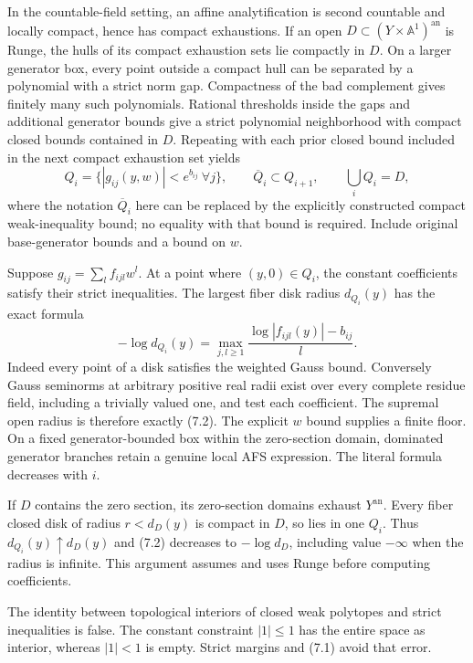 \documentclass[
  10pt,
]{article}
\begin{document}
In the countable-field setting, an affine analytification is second
countable and locally compact, hence has compact exhaustions. If an open
\(D\subset(Y\times\mathbb A^1)^{\mathrm{an}}\) is Runge, the hulls of
its compact exhaustion sets lie compactly in \(D\). On a larger
generator box, every point outside a compact hull can be separated by a
polynomial with a strict norm gap. Compactness of the bad complement
gives finitely many such polynomials. Rational thresholds inside the
gaps and additional generator bounds give a strict polynomial
neighborhood with compact closed bounds contained in \(D\). Repeating
with each prior closed bound included in the next compact exhaustion set
yields \[Q_i=\{|g_{ij}(y,w)|<e^{b_{ij}}\ \forall j\},\qquad
 \overline Q_i\subset Q_{i+1},\qquad\bigcup_iQ_i=D, \tag{7.1}\] where
the notation \(\overline Q_i\) here can be replaced by the explicitly
constructed compact weak-inequality bound; no equality with that bound
is required. Include original base-generator bounds and a bound on
\(w\).

Suppose \(g_{ij}=\sum_l f_{ijl}w^l\). At a point where \((y,0)\in Q_i\),
the constant coefficients satisfy their strict inequalities. The largest
fiber disk radius \(d_{Q_i}(y)\) has the exact formula
\[-\log d_{Q_i}(y)=\max_{j,l\ge1}\frac{\log|f_{ijl}(y)|-b_{ij}}{l}. \tag{7.2}\]
Indeed every point of a disk satisfies the weighted Gauss bound.
Conversely Gauss seminorms at arbitrary positive real radii exist over
every complete residue field, including a trivially valued one, and test
each coefficient. The supremal open radius is therefore exactly (7.2).
The explicit \(w\) bound supplies a finite floor. On a fixed
generator-bounded box within the zero-section domain, dominated
generator branches retain a genuine local AFS expression. The literal
formula decreases with \(i\).

If \(D\) contains the zero section, its zero-section domains exhaust
\(Y^{\mathrm{an}}\). Every fiber closed disk of radius \(r<d_D(y)\) is
compact in \(D\), so lies in one \(Q_i\). Thus
\(d_{Q_i}(y)\uparrow d_D(y)\) and (7.2) decreases to \(-\log d_D\),
including value \(-\infty\) when the radius is infinite. This argument
assumes and uses Runge before computing coefficients.

The identity between topological interiors of closed weak polytopes and
strict inequalities is false. The constant constraint \(|1|\le1\) has
the entire space as interior, whereas \(|1|<1\) is empty. Strict margins
and (7.1) avoid that error.
\end{document}
